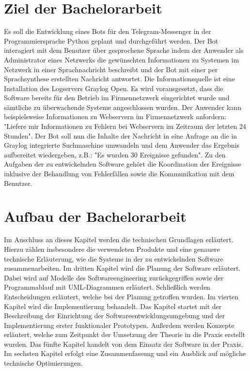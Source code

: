 \section{Ziel der Bachelorarbeit}

Es soll die Entwicklung eines Bots für den Telegram-Messenger in der Programmiersprache Python geplant und durchgeführt werden. Der Bot interagiert mit dem Benutzer über gesprochene Sprache indem der Anwender als Administrator eines Netzwerks die gewünschten Informationen zu Systemen im Netzwerk in einer Sprachnachricht beschreibt und der Bot mit einer per Sprachsynthese erstellten Nachricht antwortet. Die Informationsquelle ist eine Installation des Logservers Graylog Open. Es wird vorausgesetzt, dass die Software bereits für den Betrieb im Firmennetzwerk eingerichtet wurde und sämtliche zu überwachende Systeme angeschlossen wurden. Der Anwender kann beispielsweise Informationen zu Webservern im Firmennetzwerk anfordern: "Liefere mir Informationen zu Fehlern bei Webservern im Zeitraum der letzten 24 Stunden". Der Bot soll nun die Inhalte der Nachricht in eine Anfrage an die in Graylog integrierte Suchmaschine umwandeln und dem Anwender das Ergebnis aufbereitet wiedergeben, z.B.: "Es wurden 30 Ereignisse gefunden". Zu den Aufgaben der zu entwickelnden Software gehört die Koordination der Ereignisse inklusive der Behandlung von Fehlerfällen sowie die Kommunikation mit dem Benutzer.

\section{Aufbau der Bachelorarbeit}

Im Anschluss an dieses Kapitel werden die technischen Grundlagen erläutert. Hierzu zählen insbesondere die verwendeten Produkte und eine genauere technische Erläuterung, wie die Systeme in der zu entwickelnden Software zusammenarbeiten. Im dritten Kapitel wird die Planung der Software erläutert. Dabei wird auf Modelle des Softwareengineering zurückgegriffen sowie der Programmablauf mit UML-Diagrammen erläutert. Schließlich werden Entscheidungen erläutert, welche bei der Planung getroffen wurden. Im vierten Kapitel wird die Implementierung behandelt. Das Kapitel startet mit der Beschreibung der Einrichtung der Softwareentwicklungsumgebung und der Implementierung erster funktionaler Prototypen. Außerdem werden Konzepte erläutert, welche zum Zeitpunkt der Umsetzung der Theorie in die Praxis erstellt wurden. Das fünfte Kapitel handelt von dem Einsatz der Software in der Praxis. Im sechsten Kapitel erfolgt eine Zusammenfassung und ein Ausblick auf mögliche technische Optimierungen.